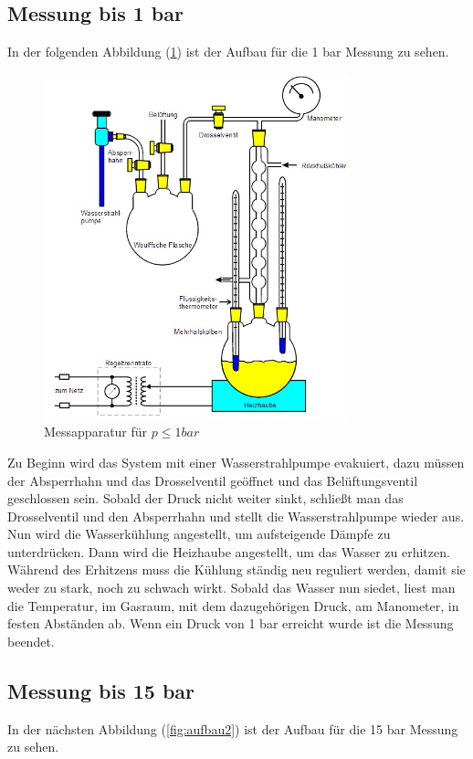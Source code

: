 \subsection{Messung bis 1 bar}
In der folgenden Abbildung (\ref{fig:aufbau1}) ist der Aufbau für die 1 bar Messung
zu sehen.

\begin{figure}
  \centering
  \includegraphics[height=10cm]{aufbau1.jpg}
  \caption{Messapparatur für $p ≤ 1 bar$}
  \label{fig:aufbau1}
\end{figure}

Zu Beginn wird das System mit einer Wasserstrahlpumpe evakuiert, dazu müssen der
Absperrhahn und das Drosselventil geöffnet und das Belüftungsventil geschlossen sein.
Sobald der Druck nicht weiter sinkt, schließt man das Drosselventil und den
Absperrhahn und stellt die Wasserstrahlpumpe wieder aus. Nun wird die Wasserkühlung
angestellt, um aufsteigende Dämpfe zu unterdrücken. Dann wird die Heizhaube angestellt,
um das Wasser zu erhitzen. Während des Erhitzens muss die Kühlung ständig neu
reguliert werden, damit sie weder zu stark, noch zu schwach wirkt.
Sobald das Wasser nun siedet, liest man die Temperatur, im Gasraum,
mit dem dazugehörigen Druck, am Manometer, in festen Abständen ab.
Wenn ein Druck von 1 bar erreicht wurde ist die Messung beendet.

\subsection{Messung bis 15 bar}
In der nächsten Abbildung (\ref{fig:aufbau2}) ist der Aufbau für die 15 bar Messung
zu sehen.

